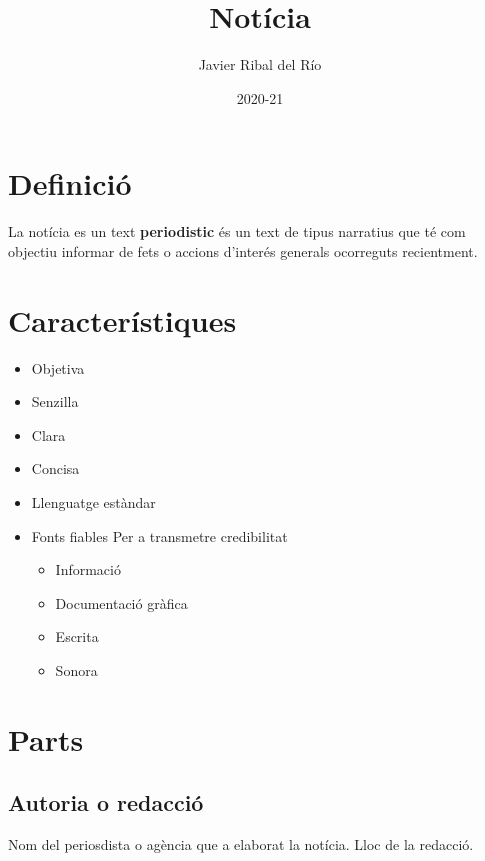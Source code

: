 \documentclass[
]{article}
\title{Notícia}
\author{Javier Ribal del Río}
\date{2020-21}
\providecommand{\tightlist}{%
  \setlength{\itemsep}{0pt}\setlength{\parskip}{0pt}}
\begin{document}
\maketitle

{
\setcounter{tocdepth}{4}
\tableofcontents
}
\hypertarget{definiciuxf3}{%
\section{Definició}\label{definiciuxf3}}

La notícia es un text \textbf{periodistic} és un text de tipus narratius
que té com objectiu informar de fets o accions d'interés generals
ocorreguts recientment.

\hypertarget{caracteruxedstiques}{%
\section{Característiques}\label{caracteruxedstiques}}

\begin{itemize}
\tightlist
\item
  Objetiva
\item
  Senzilla
\item
  Clara
\item
  Concisa
\item
  Llenguatge estàndar
\item
  Fonts fiables Per a transmetre credibilitat

  \begin{itemize}
  \tightlist
  \item
    Informació
  \item
    Documentació gràfica
  \item
    Escrita
  \item
    Sonora
  \end{itemize}
\end{itemize}

\hypertarget{parts}{%
\section{Parts}\label{parts}}

\hypertarget{autoria-o-redacciuxf3}{%
\subsection{Autoria o redacció}\label{autoria-o-redacciuxf3}}

Nom del periosdista o agència que a elaborat la notícia. Lloc de la
redacció.
\end{document}
